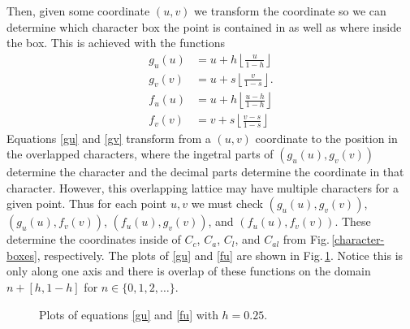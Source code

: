 \documentclass[12pt]{article}
\begin{document}
Then, given some coordinate $(u,v)$ we transform the coordinate so we can determine which character box the point is contained in as well as where inside the box. This is achieved with the functions
\begin{align}
	g_u(u) &= u + h \left\lfloor \frac{u}{1-h} \right\rfloor \label{gu} \\
	g_v(v) &= u + s \left\lfloor \frac{v}{1-s} \right\rfloor. \label{gv} \\
	f_u(u) &= u + h \left\lfloor \frac{u - h}{1-h} \right\rfloor \label{fu} \\
	f_v(v) &= v + s \left\lfloor \frac{v - s}{1-s} \right\rfloor \label{fv}
\end{align}
Equations \eqref{gu} and \eqref{gv} transform from a $(u,v)$ coordinate to the position in the overlapped characters, where the ingetral parts of $(g_u(u), g_v(v))$ determine the character and the decimal parts determine the coordinate in that character. However, this overlapping lattice may have multiple characters for a given point. Thus for each point $u,v$ we must check $(g_u(u), g_v(v))$, $(g_u(u), f_v(v))$, $(f_u(u), g_v(v))$, and $(f_u(u), f_v(v))$. These determine the coordinates inside of $C_c$, $C_a$, $C_l$, and $C_{al}$ from Fig.\,\ref{character-boxes}, respectively. The plots of \eqref{gu} and \eqref{fu} are shown in Fig.\,\ref{transformplot}. Notice this is only along one axis and there is overlap of these functions on the domain $n + [h, 1-h]$ for $n \in \{0, 1, 2, \dots \}$.

\begin{figure}[ht]
\centering
{}
\caption{Plots of equations \eqref{gu} and \eqref{fu} with $h = 0.25$.}
\label{transformplot}
\end{figure}
\end{document}
